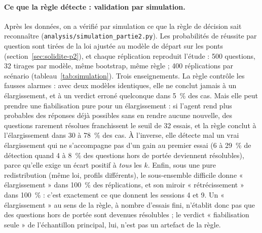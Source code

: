 \paragraph{Ce que la règle détecte : validation par simulation.} Après les données, on a vérifié par simulation ce que la règle de décision sait reconnaître (\texttt{analysis/simulation\_partie2.py}). Les probabilités de réussite par question sont tirées de la loi ajustée au modèle de départ sur les ponts (section~\ref{sec:solidite-p2}), et chaque réplication reproduit l'étude : 500 questions, 32 tirages par modèle, même bootstrap, même règle ; 400 réplications par scénario (tableau~\ref{tab:simulation}). Trois enseignements. La règle contrôle les fausses alarmes : avec deux modèles identiques, elle ne conclut jamais à un élargissement, et à un verdict erroné quelconque dans 5~\% des cas. Mais elle peut prendre une fiabilisation pure pour un élargissement : si l'agent rend plus probables des réponses déjà possibles sans en rendre aucune nouvelle, des questions rarement résolues franchissent le seuil de 32 essais, et la règle conclut à l'élargissement dans 30 à 78~\% des cas. À l'inverse, elle détecte mal un vrai élargissement qui ne s'accompagne pas d'un gain au premier essai (6 à 29~\% de détection quand 4 à 8~\% des questions hors de portée deviennent résolubles), parce qu'elle exige un écart positif à \emph{tous} les $k$. Enfin, sous une pure redistribution (même loi, profils différents), le sous-ensemble difficile donne « élargissement » dans 100~\% des réplications, et son miroir « rétrécissement » dans 100~\% : c'est exactement ce que donnent les sessions 4 et 9. Un « élargissement » au sens de la règle, à nombre d'essais fini, n'établit donc pas que des questions hors de portée sont devenues résolubles ; le verdict « fiabilisation seule » de l'échantillon principal, lui, n'est pas un artefact de la règle.

